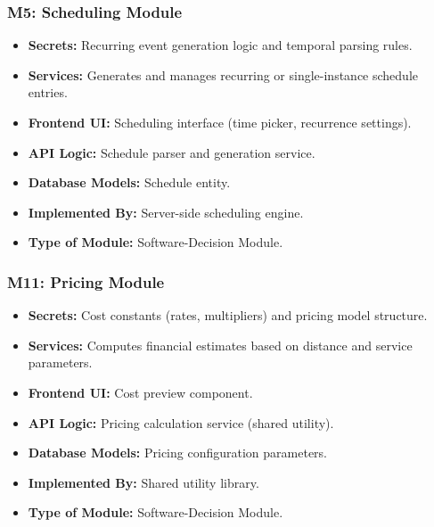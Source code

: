 \subsubsection*{M5: Scheduling Module}
\begin{itemize}
  \item \textbf{Secrets:} Recurring event generation logic and temporal parsing rules.
  \item \textbf{Services:} Generates and manages recurring or single-instance schedule entries.
  \item \textbf{Frontend UI:} Scheduling interface (time picker, recurrence settings).
  \item \textbf{API Logic:} Schedule parser and generation service.
  \item \textbf{Database Models:} Schedule entity.
  \item \textbf{Implemented By:} Server-side scheduling engine.
  \item \textbf{Type of Module:} Software-Decision Module.
\end{itemize}

\subsubsection*{M11: Pricing Module}
\begin{itemize}
  \item \textbf{Secrets:} Cost constants (rates, multipliers) and pricing model structure.
  \item \textbf{Services:} Computes financial estimates based on distance and service parameters.
  \item \textbf{Frontend UI:} Cost preview component.
  \item \textbf{API Logic:} Pricing calculation service (shared utility).
  \item \textbf{Database Models:} Pricing configuration parameters.
  \item \textbf{Implemented By:} Shared utility library.
  \item \textbf{Type of Module:} Software-Decision Module.
\end{itemize}

